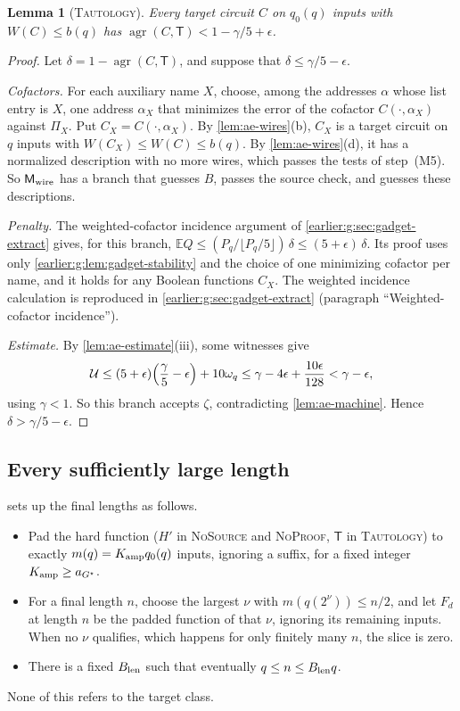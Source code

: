 \documentclass[11pt,letterpaper]{article}
\newtheorem{lemma}[theorem]{Lemma}
\theoremstyle{definition}
\theoremstyle{remark}
\newcommand{\E}{\mathbb E}
\newcommand{\agr}{\operatorname{agr}}
\begin{document}
\begin{lemma}[\textsc{Tautology}]\label{lem:ae-table}
Every target circuit \(C\) on \(q_0(q)\) inputs with \(W(C)\le b(q)\)
has \(\agr(C,\mathsf T)<1-\gamma/5+\epsilon\).
\end{lemma}
\begin{proof}
Let \(\delta=1-\agr(C,\mathsf T)\), and suppose that
\(\delta\le\gamma/5-\epsilon\).

\emph{Cofactors.} For each auxiliary name \(X\), choose, among the
addresses \(\alpha\) whose list entry is \(X\), one address
\(\alpha_X\) that minimizes the error of the cofactor
\(C(\cdot,\alpha_X)\) against \(\Pi_X\). Put \(C_X=C(\cdot,\alpha_X)\).
By \cref{lem:ae-wires}(b), \(C_X\) is a target circuit on \(q\) inputs
with \(W(C_X)\le W(C)\le b(q)\). By \cref{lem:ae-wires}(d), it has a
normalized description with no more wires, which passes the tests of
step~(M5). So \(\mathsf M_{\rm wire}\) has a branch that guesses \(B\),
passes the source check, and guesses these descriptions.

\emph{Penalty.} The weighted-cofactor incidence argument of \cref{earlier:g:sec:gadget-extract} gives, for this branch,
\(\E Q\le(P_q/\lfloor P_q/5\rfloor)\,\delta\le(5+\epsilon)\,\delta\). Its
proof uses only \cref{earlier:g:lem:gadget-stability} and the choice of one
minimizing cofactor per name, and it holds for any Boolean functions
\(C_X\).
The weighted incidence calculation is reproduced in \cref{earlier:g:sec:gadget-extract} (paragraph ``Weighted-cofactor incidence'').

\emph{Estimate.} By \cref{lem:ae-estimate}(iii), some witnesses give
\[
 \mathcal U\le(5+\epsilon)\Bigl(\frac\gamma5-\epsilon\Bigr)+10\omega_q
 \le\gamma-4\epsilon+\frac{10\epsilon}{128}<\gamma-\epsilon,
\]
using \(\gamma<1\). So this branch accepts \(\zeta\), contradicting
\cref{lem:ae-machine}. Hence \(\delta>\gamma/5-\epsilon\).
\end{proof}

\subsection{Every sufficiently large length}\label{sec:ae-lengths}

\cite[Section~11.6]{NagCG} sets up the final lengths as follows.
\begin{itemize}
\item Pad the hard function (\(H'\) in \textsc{NoSource} and
\textsc{NoProof}, \(\mathsf T\) in \textsc{Tautology}) to exactly
\(m(q)=K_{\rm amp}q_0(q)\) inputs, ignoring a suffix, for a fixed
integer \(K_{\rm amp}\ge a_{G^\star}\).
\item For a final length \(n\), choose the largest \(\nu\) with
\(m(q(2^\nu))\le n/2\), and let \(F_d\) at length \(n\) be the padded
function of that \(\nu\), ignoring its remaining inputs. When no
\(\nu\) qualifies, which happens for only finitely many \(n\), the
slice is zero.
\item There is a fixed \(B_{\rm len}\) such that eventually
\(q\le n\le B_{\rm len}q\).
\end{itemize}
None of this refers to the target class.
\end{document}
